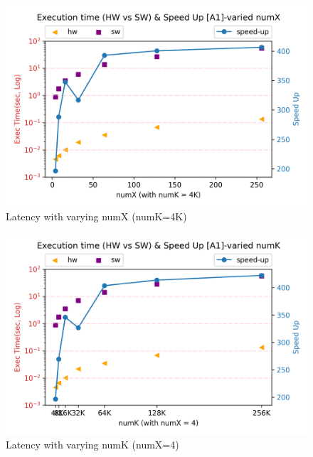 \begin{figure}[h!]
    \centering
    \includegraphics[width=\columnwidth]{figures/a1-vary-x.png}
    \caption{Latency with varying numX (numK=4K)}
    \label{fig-a1-x}
\end{figure}

\begin{figure}[h!]
    \centering
    \includegraphics[width=\columnwidth]{figures/a1-vary-k.png}
    \caption{Latency with varying numK (numX=4)}
    \label{fig-a1-k}
\end{figure}
